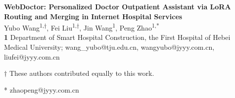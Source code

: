 \documentclass[10pt,letterpaper]{article}
\begin{document}
\vspace*{0.2in}

\begin{flushleft}
{\Large
\textbf{WebDoctor: Personalized Doctor Outpatient Assistant via LoRA Routing and Merging in Internet Hospital Services}
}
\newline
\\
Yubo Wang\textsuperscript{1,$\dag$},
Fei Liu\textsuperscript{1,$\dag$},
Jin Wang\textsuperscript{1},
Peng Zhao\textsuperscript{1,*}
\\
\bigskip
\textbf{1} Department of Smart Hospital Construction, the First Hospital of Hebei Medical University; wang\_yubo@tju.edu.cn, wangyubo@jyyy.com.cn, liufei@jyyy.com.cn
\\
\bigskip

$\dag$ These authors contributed equally to this work.

* zhaopeng@jyyy.com.cn

\end{flushleft}













\nolinenumbers


\end{document}
